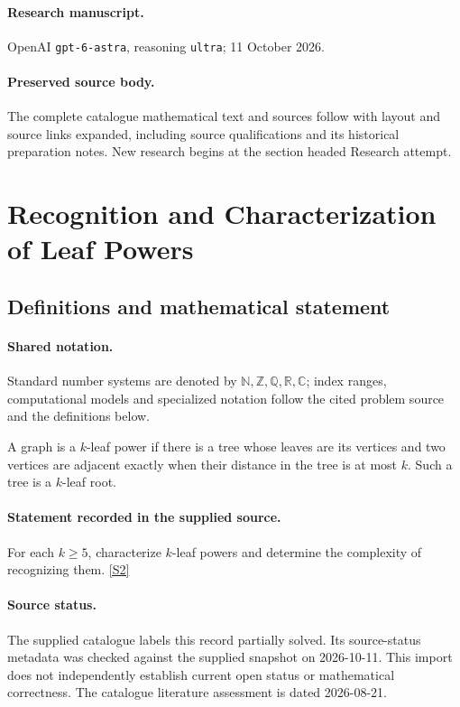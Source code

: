 \documentclass[11pt]{article}
\begin{document}
\paragraph{Research manuscript.} OpenAI \texttt{gpt-6-astra}, reasoning \texttt{ultra}; 11 October 2026.
\paragraph{Preserved source body.} The complete catalogue mathematical text and sources follow with layout and source links expanded, including source qualifications and its historical preparation notes. New research begins at the section headed Research attempt.

\section{Recognition and Characterization of Leaf Powers}\label{statement}

\subsection{Definitions and mathematical statement}

\paragraph{Shared notation.}Standard number systems are denoted by $\mathbb N,\mathbb Z,\mathbb Q,\mathbb R,\mathbb C$; index ranges, computational models and specialized notation follow the cited problem source and the definitions below.


A graph is a $k$-leaf power if there is a tree whose leaves are its vertices and two vertices are adjacent exactly when their distance in the tree is at most $k$. Such a tree is a $k$-leaf root.
\paragraph{Statement recorded in the supplied source.}
For each $k\geq5$, characterize $k$-leaf powers and determine the complexity of recognizing them. \href{https://doi.org/10.4171/owr/2006/07}{[S2]}
\paragraph{Source status.}
The supplied catalogue labels this record partially solved. Its source-status metadata was checked against the supplied snapshot on 2026-10-11. This import does not independently establish current open status or mathematical correctness. The catalogue literature assessment is dated 2026-08-21.
\end{document}
